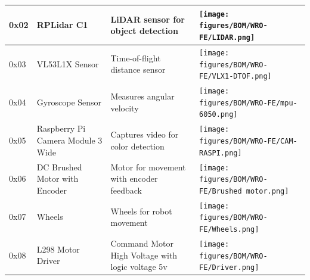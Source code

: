 \documentclass[12pt,a4paper]{article}
\begin{document}
\newpage


\section*{}

\begin{tabularx}{\textwidth}{|l|X|X|X|}
\hline
0x02 & RPLidar C1 & LiDAR sensor for object detection & 
\texttt{[image: figures/BOM/WRO-FE/LIDAR.png]} \\
\hline
0x03 & VL53L1X Sensor & Time-of-flight distance sensor & 
\texttt{[image: figures/BOM/WRO-FE/VLX1-DTOF.png]} \\
\hline
0x04 & Gyroscope Sensor & Measures angular velocity & 
\texttt{[image: figures/BOM/WRO-FE/mpu-6050.png]} \\
\hline
0x05 & Raspberry Pi Camera Module 3 Wide & Captures video for color detection & 
\texttt{[image: figures/BOM/WRO-FE/CAM-RASPI.png]} \\
\hline
0x06 & DC Brushed Motor with Encoder & Motor for movement with encoder feedback & 
\texttt{[image: figures/BOM/WRO-FE/Brushed motor.png]} \\
\hline
0x07 & Wheels & Wheels for robot movement & 
\texttt{[image: figures/BOM/WRO-FE/Wheels.png]} \\
\hline
0x08 & L298 Motor Driver & Command Motor High Voltage with logic voltage 5v & 
\texttt{[image: figures/BOM/WRO-FE/Driver.png]} \\
\hline

\end{tabularx}

\newpage

\section*{}
\end{document}
